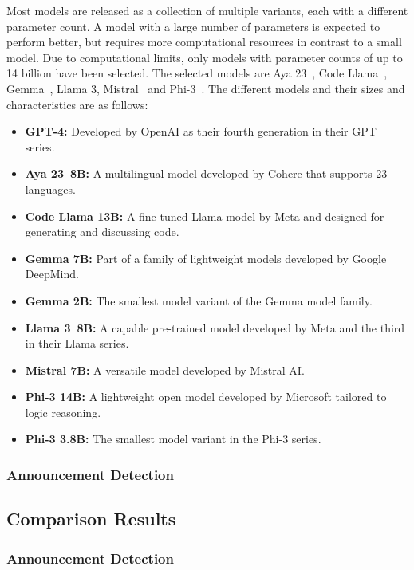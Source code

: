 Most models are released as a collection of multiple variants, each with a different parameter count.
A model with a large number of parameters is expected to perform better, but requires more computational resources
in contrast to a small model.
Due to computational limits, only models with parameter counts of up to 14 billion have been selected.
The selected models are Aya 23\ \citep{aryabumi2024aya}, Code Llama\ \citep{roziere2023code},
Gemma\ \citep{team2024gemma}, Llama 3, Mistral\ \citep{jiang2023mistral} and Phi-3\ \citep{abdin2024phi}.
The different models and their sizes and characteristics are as follows:
\begin{itemize}
    \item \textbf{GPT-4:} Developed by OpenAI as their fourth generation in their GPT series.
    \item \textbf{Aya 23\ 8B:} A multilingual model developed by Cohere that supports 23 languages.
    \item \textbf{Code Llama 13B:} A fine-tuned Llama model by Meta and designed for generating and discussing code.
    \item \textbf{Gemma 7B:} Part of a family of lightweight models developed by Google DeepMind.
    \item \textbf{Gemma 2B:} The smallest model variant of the Gemma model family.
    \item \textbf{Llama 3\ 8B:} A capable pre-trained model developed by Meta and the third in their Llama series.
    \item \textbf{Mistral 7B:} A versatile model developed by Mistral AI\@.
    \item \textbf{Phi-3 14B:} A lightweight open model developed by Microsoft tailored to logic reasoning.
    \item \textbf{Phi-3 3.8B:} The smallest model variant in the Phi-3 series.
\end{itemize}

\subsubsection{Announcement Detection}

\subsection{Comparison Results}
\label{subsec:rq3-comparison-results}

\subsubsection{Announcement Detection}

